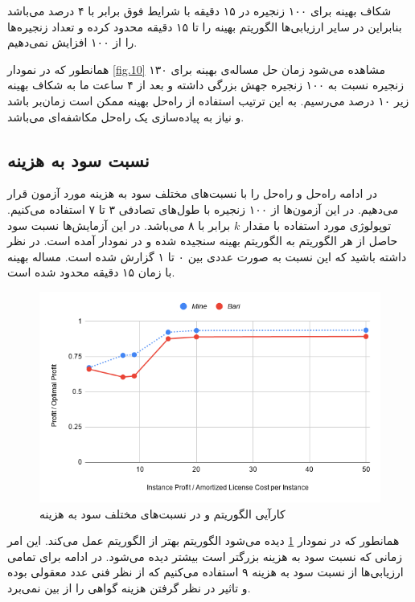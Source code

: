 شکاف بهینه برای ۱۰۰ زنجیره در ۱۵ دقیقه با شرایط فوق برابر با ۴ درصد می‌باشد بنابراین
در سایر ارزیابی‌ها الگوریتم بهینه را تا ۱۵ دقیقه محدود کرده و تعداد زنجیره‌ها را از ۱۰۰ افزایش نمی‌دهیم.

همانطور که در نمودار \ref{fig.10} مشاهده می‌شود زمان حل مساله‌ی بهینه برای ۱۳۰ زنجیره نسبت به ۱۰۰ زنجیره جهش بزرگی داشته
و بعد از ۴ ساعت ما به شکاف بهینه زیر ۱۰ درصد می‌رسیم.
به این ترتیب استفاده از راه‌حل بهینه ممکن است زمان‌بر باشد و نیاز به پیاده‌سازی یک راه‌حل مکاشفه‌ای می‌باشد.

\subsection{نسبت سود به هزینه}

در ادامه راه‌حل  و راه‌حل  را با نسبت‌های مختلف سود به هزینه مورد آزمون قرار می‌دهیم. 
در این آزمون‌ها از ۱۰۰ زنجیره با طول‌های تصادفی ۳ تا ۷ استفاده می‌کنیم.
توپولوژی مورد استفاده
با مقدار \(k\)
برابر با ۸
می‌باشد.
در این آزمایش‌ها نسبت سود حاصل از هر الگوریتم به الگوریتم بهینه سنجیده شده و در نمودار آمده است.
در نظر داشته باشید که این نسبت به صورت عددی بین ۰ تا ۱ گزارش شده است.
مساله بهینه با زمان ۱۵ دقیقه محدود شده است.


\begin{figure}[h]
\center\includegraphics[scale=.5]{images/chart-1}
\caption{کارآیی الگوریتم  و  در نسبت‌های مختلف سود به هزینه}
\label{fig.4}
\end{figure}

همانطور که در نمودار \ref{fig.4} دیده می‌شود الگوریتم  بهتر از الگوریتم  عمل می‌کند.
این امر زمانی که نسبت سود به هزینه بزرگتر است بیشتر دیده می‌شود.
در ادامه برای تمامی ارزیابی‌ها از نسبت سود به هزینه ۹ استفاده می‌کنیم که از نظر فنی عدد معقولی بوده و تاثیر در نظر گرفتن هزینه گواهی را از بین نمی‌برد.

